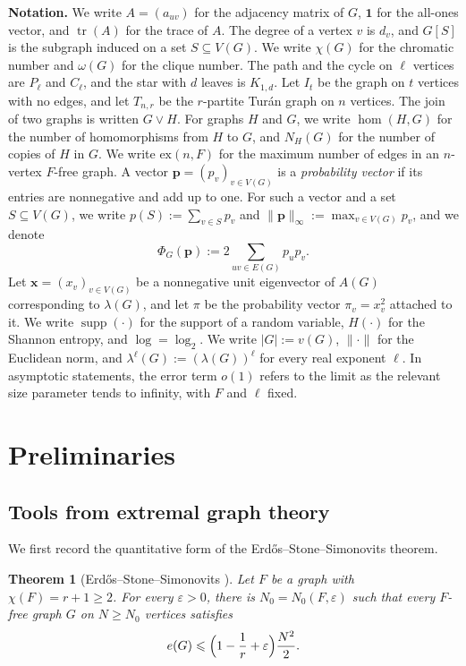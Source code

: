 \documentclass[11pt, a4paper]{article}
\newtheorem{theorem}{Theorem}[section]
\theoremstyle{definition}
\theoremstyle{plain}
\newcommand{\tr}{\operatorname{tr}}
\newcommand{\ex}{\mathrm{ex}}
\renewcommand{\le}{\leqslant}
\renewcommand{\ge}{\geqslant}
\newcommand{\one}{\mathbf{1}}
\newcommand{\supp}{\operatorname{supp}}
\newcommand{\pmax}{\lVert \bm{p} \rVert_{\infty}}
\newcommand{\PhiG}{\Phi_G}
\begin{document}
\medskip 
\noindent
{\bf Notation.} 
 We write $A=(a_{uv})$ for the adjacency
matrix of $G$, $\one$ for the all-ones vector, and
$\tr (A)$ for the trace of $A$. The degree of a vertex $v$ is $d_v$, and $G[S]$ is the subgraph induced on a set $S\subseteq V(G)$. We write $\chi (G)$ for the chromatic number and $\omega (G)$ for the clique number. 
The path and the cycle on $\ell$ vertices are $P_\ell$ and $C_\ell$, and the star with $d$ leaves is $K_{1,d}$. 
Let $I_t$ be the graph on $t$ vertices with no edges, and let $T_{n,r}$ be the $r$-partite Tur\'an graph on $n$ vertices. The join of two graphs is written $G\vee H$. For graphs $H$ and $G$, we write $\hom (H,G)$ for the number of homomorphisms from $H$ to $G$, and $N_H(G)$ for the number of  copies of $H$ in $G$. We write $\ex(n,F)$ for the maximum number of edges in an $n$-vertex $F$-free graph. 
A vector $\bm{p}=(p_v)_{v\in V(G)}$ is a
\emph{probability vector} if its entries are
nonnegative and add up to one. For such a vector and a set $S\subseteq V(G)$, we write
$p(S):=\sum_{v\in S}p_v$ and
$\pmax:=\max_{v\in V(G)}p_v$, and we denote 
\[
  \PhiG(\bm{p}):=2\!\!\sum_{uv\in E(G)}\!\!p_up_v .
\]
Let $\bm{x}=(x_v)_{v\in V(G)}$ be a
nonnegative unit eigenvector of $A(G)$ corresponding to $\lambda (G)$, and let $\pi$ be the probability vector $\pi_v=x_v^2$ attached to it. We write $\supp (\cdot)$ for the support of a random variable, $H(\cdot )$ for the Shannon entropy, and
$\log =\log_2$. We write $|G|:=v(G)$, $\lVert \cdot \rVert$ for the Euclidean norm, and
$\lambda^{\ell}(G):= (\lambda (G) )^{\ell}$
for every real exponent $\ell$.
 In asymptotic statements, the error term $o(1)$ refers to the limit as the relevant size parameter tends to infinity, with $F$ and $\ell$ fixed. 
 




\section{Preliminaries} 

\label{sec:preliminaries}



\subsection{Tools from extremal graph theory} 

We first record the quantitative form of the Erd\H{o}s--Stone--Simonovits theorem.

\begin{theorem}[Erd\H{o}s--Stone--Simonovits
\cite{ES1946,ES1966}]
\label{thm:ess}
Let $F$ be a graph with $\chi (F)=r+1\ge 2$. For every $\varepsilon >0$, 
there is $N_0=N_0(F,\varepsilon )$ such that 
every $F$-free graph $G$ 
on $N \ge N_0$ vertices satisfies
$$e(G)\le \Bigl(1-\frac1r+\varepsilon \Bigr)\frac{N^2}{2}.$$
\end{theorem} 
\end{document}
